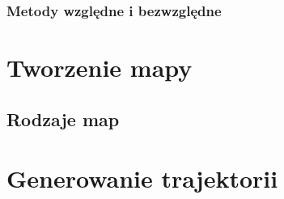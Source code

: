 \subsubsection{Metody względne i bezwzględne}


\section{Tworzenie mapy}

\subsection{Rodzaje map}

\section{Generowanie trajektorii}

